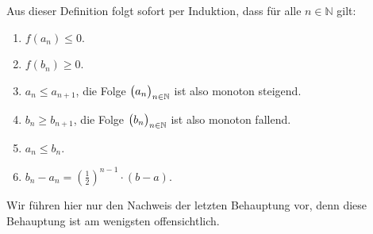 Aus dieser Definition folgt sofort per Induktion, dass f\"ur alle $n\in\mathbb{N}$
gilt:
\begin{enumerate}
\item $f(a_n) \leq 0$.
\item $f(b_n) \geq 0$.
\item $a_n \leq a_{n+1}$, \quad die Folge $\bigl(a_n\bigr)_{n\in\mathbb{N}}$ ist also monoton
      steigend.
\item $b_n \geq b_{n+1}$, \quad die Folge $\bigl(b_n\bigr)_{n\in\mathbb{N}}$ ist also monoton
      fallend.
\item $a_n \leq b_n$.
\item $\displaystyle b_n - a_n = \left(\frac{1}{2}\right)^{n-1} \cdot (b - a)$.
\end{enumerate}
Wir f\"uhren hier nur den Nachweis der letzten Behauptung vor, denn diese Behauptung
ist am wenigsten offensichtlich.
